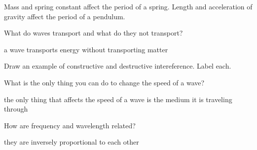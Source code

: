 \documentclass[10pt]{exam}
\begin{document}
\begin{questions}
  \begin{solution}[\stretch{2}]
    Mass and spring constant affect the period of a spring.  Length and acceleration of gravity affect the period of a pendulum.
  \end{solution}

\question
  What do waves transport and what do they not transport?

  \begin{solution}[\stretch{2}]
    a wave transports energy without transporting matter
  \end{solution}

\question
  Draw an example of constructive and destructive intereference.  Label each.

  \begin{solution}[\stretch{2}]
    
  \end{solution}

\question
  What is the only thing you can do to change the speed of a wave?
  
  \begin{solution}[\stretch{2}]
    the only thing that affects the speed of a wave is the medium it is traveling through
  \end{solution}

\question
  How are frequency and wavelength related?

  \begin{solution}[\stretch{2}]
    they are inversely proportional to each other
  \end{solution}

\end{questions}
\end{document}
